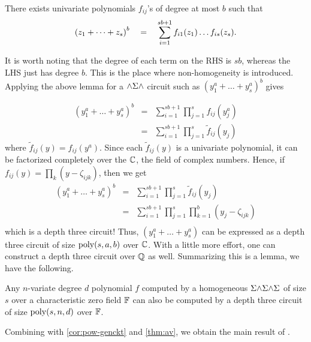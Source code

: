 \begin{lemma}\label{lem:duality} There exists univariate polynomials $f_{ij}$'s of degree at most $b$ such that
$$
\left(z_1 + \dots + z_s\right)^b \quad = \quad \sum_{i=1}^{sb+1}
f_{i1}(z_1)\dots f_{is}(z_s).
$$
\end{lemma}

It is worth noting that the degree of each term on the RHS is $sb$,
whereas the LHS just has degree $b$.
This is the place where non-homogeneity is introduced.
Applying the above lemma for a $\mathord{\wedge}\Sigma\mathord{\wedge}$ circuit such
as $(y_1^a + \dots + y_s^a)^b$ gives

\begin{eqnarray*}
  (y_1^a + \dots + y_s^a)^b & = & \sum_{i=1}^{sb+1} \prod_{j=1}^s f_{ij}(y_j^a)\\
  & = & \sum_{i=1}^{sb+1} \prod_{j=1}^s \tilde{f}_{ij}(y_j)
\end{eqnarray*}
where $\tilde{f}_{ij}(y) = f_{ij}(y^a)$.
Since each $\tilde{f}_{ij}(y)$ is a univariate polynomial, it can be
factorized completely over the $\mathbb{C}$, the field of complex numbers.
Hence, if $f_{ij}(y) = \prod_k (y - \zeta_{ijk})$, then we get
\begin{eqnarray*}
  (y_1^a + \dots + y_s^a)^b & = & \sum_{i=1}^{sb+1} \prod_{j=1}^s \tilde{f}_{ij}(y_j)\\
  &= & \sum_{i=1}^{sb+1} \prod_{j=1}^s \prod_{k=1}^b (y_j - \zeta_{ijk})\\
\end{eqnarray*}
which is a depth three circuit! 
Thus, $(y_1^a + \dots + y_s^a)$ can be
expressed as a depth three circuit of size $\operatorname{poly}(s,a,b)$ over $\mathbb{C}$.
With a little more effort, one can construct a depth three circuit
over $\mathbb{Q}$ as well.
Summarizing this is a lemma, we have the following. 

\begin{lemma}
  Any $n$-variate degree $d$ polynomial $f$ computed by a homogeneous
  $\Sigma\mathord{\wedge}\Sigma\mathord{\wedge}\Sigma$ of size $s$ over a characteristic zero field $\mathbb{F}$ can also
  be computed by a depth three circuit of size $\operatorname{poly}(s,n,d)$ over
  $\mathbb{F}$. 
\end{lemma}

Combining with \autoref{cor:pow-genckt} and \autoref{thm:av}, we obtain the main result of \cite{gkks13b}. \\

\\

